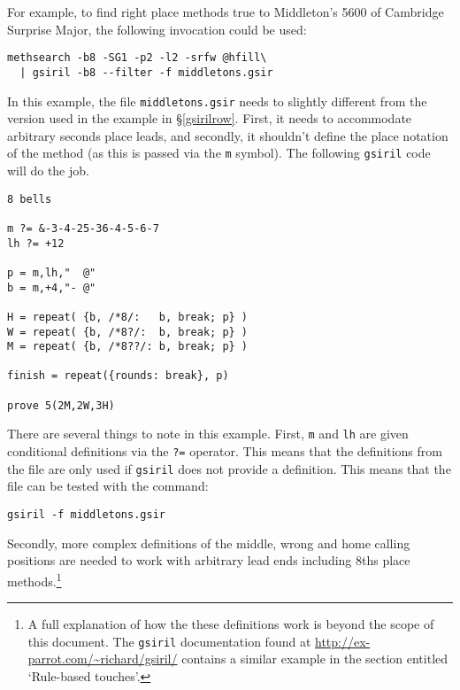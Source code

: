 \documentclass[a4paper,11pt,oneside]{book}
\newcommand{\sref}[1]{\hyperref[#1]{\S\ref{#1}}}
\begin{document}
For example, to find right place methods true to Middleton's 5600 of 
Cambridge Surprise Major,
the following invocation could be used:%
\begin{Verbatim}[commandchars=@~~]
methsearch -b8 -SG1 -p2 -l2 -srfw @hfill\
  | gsiril -b8 --filter -f middletons.gsir
\end{Verbatim}

In this example, the file \verb+middletons.gsir+ needs to slightly different
from the version used in the example in \sref{gsirilrow}.  First, it needs
to accommodate arbitrary seconds place leads, and secondly, it shouldn't 
define the place notation of the method (as this is passed via the \verb+m+
symbol).  The following \texttt{gsiril} code will do the job.
\begin{Verbatim}
8 bells

m ?= &-3-4-25-36-4-5-6-7
lh ?= +12

p = m,lh,"  @"
b = m,+4,"- @"

H = repeat( {b, /*8/:   b, break; p} )
W = repeat( {b, /*8?/:  b, break; p} )
M = repeat( {b, /*8??/: b, break; p} )

finish = repeat({rounds: break}, p)

prove 5(2M,2W,3H)
\end{Verbatim}

There are several things to note in this example.  First, \verb+m+ and
\verb+lh+ are given conditional definitions via the \verb+?=+ operator.
This means that the definitions from the file are only used if \texttt{gsiril}
does not provide a definition.  This means that the file can be tested
with the command:

\begin{Verbatim}
gsiril -f middletons.gsir
\end{Verbatim}

Secondly, more complex definitions of the middle, 
wrong\index{wrong} and home\index{home} calling positions are needed
to work with arbitrary lead ends including 8ths
place methods.\footnote{A full explanation of how the these definitions work
is beyond the scope of this document.  The \texttt{gsiril} 
documentation found at \url{http://ex-parrot.com/~richard/gsiril/} contains 
a similar example in the section entitled `Rule-based touches'.}

\end{document}
